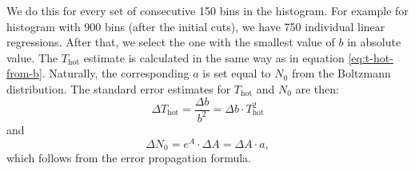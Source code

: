 We do this for every set of consecutive 150 bins in the histogram. For example for histogram with 900 bins (after the initial cuts), we have 750 individual linear regressions. After that, we select the one with the smallest value of $b$ in absolute value. The $T_\mathrm{hot}$ estimate is calculated in the same way as in equation \ref{eq:t-hot-from-b}. Naturally, the corresponding $a$ is set equal to $N_0$ from the Boltzmann distribution. The standard error estimates for $T_\mathrm{hot}$ and $N_0$ are then:
\begin{equation}
	\Delta T_\mathrm{hot} = \frac{\Delta b}{b^2} =  \Delta b\cdot   T_\mathrm{hot}^2
\end{equation}
and
\begin{equation}
	\Delta N_0 = e^A\cdot \Delta A  =  \Delta A  \cdot a,
\end{equation}
which follows from the error propagation formula.

